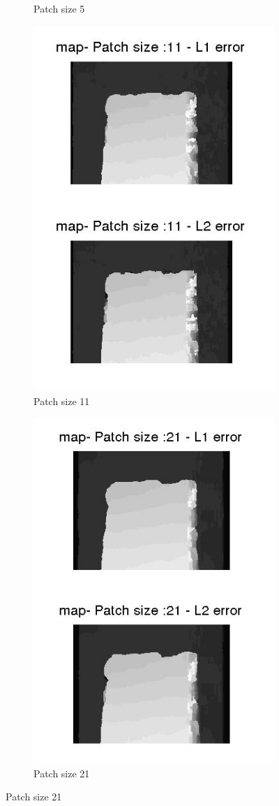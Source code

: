 \documentclass[fleqn]{article}
\begin{document}
\begin{figure}[!ht]
\begin{subfigure}{0.3\textwidth}
\caption{Patch size 5}
\end{subfigure}
\begin{subfigure}{0.3\textwidth}
 \centering
\includegraphics[scale=0.3]{./pics/map_disparity_patchsize_11.jpg}
\caption{Patch size 11}
\end{subfigure}%
\begin{subfigure}{0.3\textwidth}
\centering
\includegraphics[scale=0.3]{./pics/map_disparity_patchsize_21.jpg}
\caption{Patch size 21}
\end{subfigure}%
\end{figure}
\end{document}
